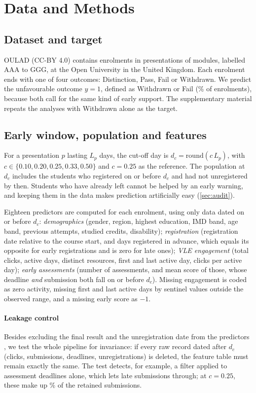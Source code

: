 \documentclass[journal]{IEEEtran}
\begin{document}
\section{Data and Methods}
\label{sec:methods}

\subsection{Dataset and target}
OULAD \cite{kuzilek2017oulad} (CC-BY 4.0) contains \resNEnrol{} enrolments in \resNPres{} presentations of \resNModules{} modules, labelled AAA to GGG, at the Open University in the United Kingdom. Each enrolment ends with one of four outcomes: Distinction, Pass, Fail or Withdrawn. We predict the unfavourable outcome $y=1$, defined as Withdrawn or Fail (\resRiskAll\% of enrolments), because both call for the same kind of early support. The supplementary material repeats the analyses with Withdrawn alone as the target.

\subsection{Early window, population and features}
For a presentation $p$ lasting $L_p$ days, the cut-off day is $d_c=\mathrm{round}(c\,L_p)$, with $c\in\{0.10,0.20,0.25,0.33,0.50\}$ and $c=0.25$ as the reference. The population at $d_c$ includes the students who registered on or before $d_c$ and had not unregistered by then. Students who have already left cannot be helped by an early warning, and keeping them in the data makes prediction artificially easy (\cref{sec:audit}).

Eighteen predictors are computed for each enrolment, using only data dated on or before $d_c$:
\emph{demographics} (gender, region, highest education, IMD band, age band, previous attempts, studied credits, disability);
\emph{registration} (registration date relative to the course start, and days registered in advance, which equals its opposite for early registrations and is zero for late ones);
\emph{VLE engagement} (total clicks, active days, distinct resources, first and last active day, clicks per active day);
\emph{early assessments} (number of assessments, and mean score of those, whose deadline \emph{and} submission both fall on or before $d_c$). Missing engagement is coded as zero activity, missing first and last active days by sentinel values outside the observed range, and a missing early score as $-1$.

\paragraph*{Leakage control} Besides excluding the final result and the unregistration date from the predictors \cite{kaufman2012leakage}, we test the whole pipeline for invariance: if every raw record dated after $d_c$ (clicks, submissions, deadlines, unregistrations) is deleted, the feature table must remain exactly the same. The test detects, for example, a filter applied to assessment deadlines alone, which lets late submissions through; at $c=0.25$, these make up \resPctLateSub\% of the retained submissions.
\end{document}

